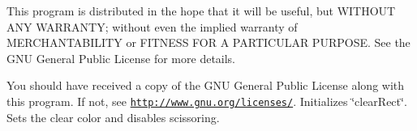 This program is distributed in the hope that it will be useful, but W\+I\+T\+H\+O\+U\+T A\+N\+Y W\+A\+R\+R\+A\+N\+T\+Y; without even the implied warranty of M\+E\+R\+C\+H\+A\+N\+T\+A\+B\+I\+L\+I\+T\+Y or F\+I\+T\+N\+E\+S\+S F\+O\+R A P\+A\+R\+T\+I\+C\+U\+L\+A\+R P\+U\+R\+P\+O\+S\+E. See the G\+N\+U General Public License for more details.

You should have received a copy of the G\+N\+U General Public License along with this program. If not, see \href{http://www.gnu.org/licenses/}{\tt http\+://www.\+gnu.\+org/licenses/}. Initializes \char`\"{}clear\+Rect\char`\"{}. Sets the clear color and disables scissoring. 